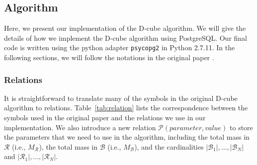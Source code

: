 
\subsection{Algorithm}

Here, we present our implementation of the D-cube algorithm. We will give the details of how we implement the D-cube algorithm using PostgreSQL. Our final code is written using the python adapter {\tt psycopg2} in Python 2.7.11. In the following sections, we will follow the notations in the original paper \cite{shin2017d}. 

\subsubsection{Relations}
It is straightforward to translate many of the symbols in the original D-cube algorithm to relations. 
Table~\ref{tab:relation} lists the correspondence between the symbols used in the original paper and the relations we use in our implementation.
We also introduce a new relation $\mathcal{P}(parameter, value)$ to store the parameters that we need to use in the algorithm,  including the total mass in $\mathcal{R}$ (i.e., $M_{\mathcal{R}}$), 
 the total mass in $\mathcal{B}$ (i.e., $M_{\mathcal{B}}$), and the cardinalities $|\mathcal{B}_1|, ..., |\mathcal{B}_N|$ and $|\mathcal{R}_1|, ..., |\mathcal{R}_N|$.

\bgroup
\def\arraystretch{1.5} %

